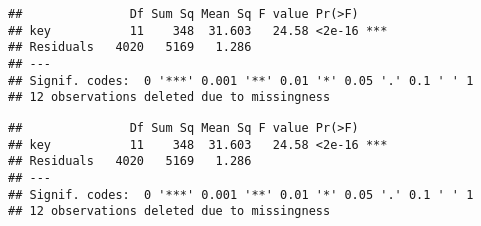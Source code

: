 \documentclass[]{article}
\newenvironment{Shaded}{\begin{snugshade}}{\end{snugshade}}
\newcommand{\KeywordTok}[1]{\textcolor[rgb]{0.13,0.29,0.53}{\textbf{#1}}}
\newcommand{\DataTypeTok}[1]{\textcolor[rgb]{0.13,0.29,0.53}{#1}}
\newcommand{\StringTok}[1]{\textcolor[rgb]{0.31,0.60,0.02}{#1}}
\newcommand{\CommentTok}[1]{\textcolor[rgb]{0.56,0.35,0.01}{\textit{#1}}}
\newcommand{\OperatorTok}[1]{\textcolor[rgb]{0.81,0.36,0.00}{\textbf{#1}}}
\newcommand{\NormalTok}[1]{#1}
\begin{document}
\begin{verbatim}
##               Df Sum Sq Mean Sq F value Pr(>F)    
## key           11    348  31.603   24.58 <2e-16 ***
## Residuals   4020   5169   1.286                   
## ---
## Signif. codes:  0 '***' 0.001 '**' 0.01 '*' 0.05 '.' 0.1 ' ' 1
## 12 observations deleted due to missingness
\end{verbatim}

\begin{Shaded}
\end{Shaded}

\begin{verbatim}
##               Df Sum Sq Mean Sq F value Pr(>F)    
## key           11    348  31.603   24.58 <2e-16 ***
## Residuals   4020   5169   1.286                   
## ---
## Signif. codes:  0 '***' 0.001 '**' 0.01 '*' 0.05 '.' 0.1 ' ' 1
## 12 observations deleted due to missingness
\end{verbatim}
\end{document}
